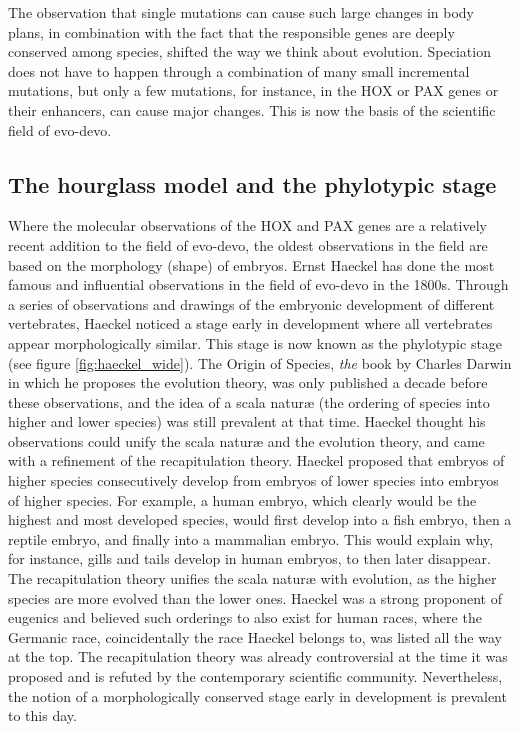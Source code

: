 The observation that single mutations can cause such large changes in body plans, in combination with the fact that the responsible genes are deeply conserved among species, shifted the way we think about evolution. Speciation does not have to happen through a combination of many small incremental mutations, but only a few mutations, for instance, in the HOX or PAX genes or their enhancers, can cause major changes. This is now the basis of the scientific field of evo-devo.

\subsection{The hourglass model and the phylotypic stage}

Where the molecular observations of the HOX and PAX genes are a relatively recent addition to the field of evo-devo, the oldest observations in the field are based on the morphology (shape) of embryos. Ernst Haeckel has done the most famous and influential observations in the field of evo-devo in the 1800s\cite{haeckel1866}. Through a series of observations and drawings of the embryonic development of different vertebrates, Haeckel noticed a stage early in development where all vertebrates appear morphologically similar. This stage is now known as the phylotypic stage (see figure \ref{fig:haeckel_wide}). The Origin of Species, \textit{the} book by Charles Darwin in which he proposes the evolution theory, was only published a decade before these observations, and the idea of a scala naturæ (the ordering of species into higher and lower species) was still prevalent at that time. Haeckel thought his observations could unify the scala naturæ and the evolution theory, and came with a refinement of the recapitulation theory. Haeckel proposed that embryos of higher species consecutively develop from embryos of lower species into embryos of higher species. For example, a human embryo, which clearly would be the highest and most developed species, would first develop into a fish embryo, then a reptile embryo, and finally into a mammalian embryo. This would explain why, for instance, gills and tails develop in human embryos, to then later disappear. The recapitulation theory unifies the scala naturæ with evolution, as the higher species are more evolved than the lower ones. Haeckel was a strong proponent of eugenics and believed such orderings to also exist for human races, where the Germanic race, coincidentally the race Haeckel belongs to, was listed all the way at the top\cite{Levit2020}. The recapitulation theory was already controversial at the time it was proposed and is refuted by the contemporary scientific community. Nevertheless, the notion of a morphologically conserved stage early in development is prevalent to this day.

